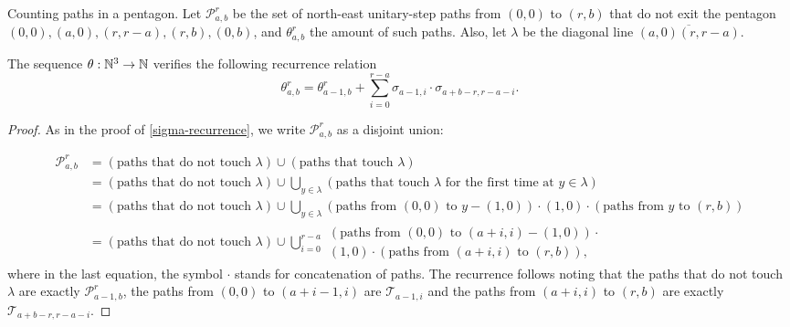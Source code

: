 \begin{subsubsection}{Counting paths in a pentagon.} Let $\mathcal{P}_{a,b}^r$ be the set of north-east unitary-step paths from $(0,0)$ to $(r,b)$ that do not exit the pentagon $(0,0),(a,0),(r,r-a),(r,b),(0,b)$, and $\theta_{a,b}^r$ the amount of such paths. Also, let $\lambda$ be the diagonal line $\overline{(a,0)(r,r-a)}$. 
\begin{myprop}
    The sequence $\theta:\mathbb{N}^3\to \mathbb{N}$ verifies the following recurrence relation
    $$
    \displaystyle \theta_{a,b}^r = \theta_{a-1,b}^r + \sum_{i=0}^{r-a}\sigma_{a-1,i}\cdot \sigma_{a+b-r,r-a-i}.
    $$
 \end{myprop}
 \begin{proof}
 As in the proof of \ref{sigma-recurrence}, we write $\mathcal{P}_{a,b}^r$ as a disjoint union:

 \begin{align*}
 \mathcal{P}_{a,b}^r &= (\mbox{paths that do not touch }\lambda)\cup (\mbox{paths that touch }\lambda)\\
                     &= (\mbox{paths that do not touch }\lambda)\cup \bigcup_{y\in \lambda} (\mbox{paths that touch }\lambda\mbox{ for the first time at $y\in \lambda$})\\
                     &= (\mbox{paths that do not touch }\lambda)\cup \bigcup_{y\in \lambda} (\mbox{paths from }(0,0)\mbox{ to }y-(1,0))\cdot (1,0)\cdot (\mbox{paths from }y\mbox{ to }(r,b))\\
                     &= (\mbox{paths that do not touch }\lambda)\cup \bigcup_{i = 0}^{r-a} \begin{array}{l}(\mbox{paths from }(0,0)\mbox{ to }(a+i,i)-(1,0))\cdot\\ (1,0)\cdot (\mbox{paths from }(a+i,i)\mbox{ to }(r,b)),\end{array}
 \end{align*}
 where in the last equation, the symbol $\cdot$ stands for concatenation of paths. The recurrence follows noting that the paths that do not touch $\lambda$ are exactly $\mathcal{P}_{a-1,b}^r$, the paths from $(0,0)$ to $(a+i-1,i)$ are $\mathcal{T}_{a-1,i}$ and the paths from $(a+i,i)$ to $(r,b)$ are exactly $\mathcal{T}_{a+b-r,r-a-i}$. \end{proof}



\end{subsubsection}
